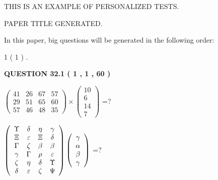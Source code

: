 \documentclass[12pt]{article}
\begin{document}
   
   
   
   
   
 \vspace{0.2in}
{\Huge  THIS IS AN EXAMPLE OF}
{\Huge  PERSONALIZED TESTS. }
   
   
 PAPER TITLE GENERATED.
   
   
   
\vspace{0.2in}
   
In this paper, big questions will be generated in the following order: 
   
   
   1 ( 1 )
 .
  
\vspace{0.2in}
  
{\textbf{\Large{QUESTION
32.1 
 ( 1 , 1 , 60 )
}}}
  
  
 
$ \left( \begin{array}{ccccccccc}
 41  & 
 26  & 
 67  & 
 57  \\ 
 29  & 
 51  & 
 65  & 
 60  \\ 
 57  & 
 46  & 
 48  & 
 35
\end{array}\right) \times
\left( \begin{array}{c}
 10  \\ 
 6  \\ 
 14  \\ 
 7
\end{array}\right) $ =?
 
 
$  %
 \left( \begin{array}
 {
 c
 c
 c
 c
 }
 \Upsilon & 
 \delta & 
 \eta & 
 \gamma \\ 
                    \Xi & 
 \varepsilon & 
                    \Xi & 
 \delta \\ 
 \Gamma & 
                    \zeta & 
 \beta & 
 \beta \\ 
 \gamma & 
 \Gamma & 
 \rho & 
 \varepsilon \\ 
                    \zeta & 
 \eta & 
 \delta & 
 \Upsilon \\ 
 \delta & 
 \varepsilon & 
                    \zeta & 
 \Psi
 \end{array} \right)
 \left( \begin{array}
 {
 c
 }
 \gamma \\ 
 \alpha \\ 
 \beta \\ 
 \gamma
 \end{array} \right)
$ =?
 
 
 
\end{document}
